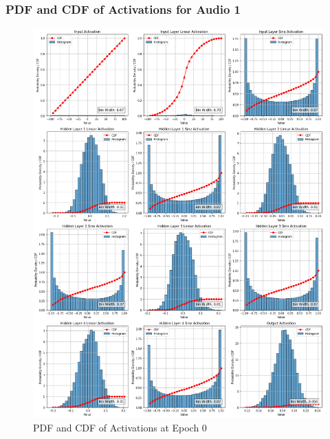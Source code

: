 \documentclass{ioereport}
\begin{document}
\subsubsection{PDF and CDF of Activations for Audio 1}

    \begin{figure}[H]
        \centering
        \includegraphics[width=\linewidth]{assets/audio histogram/epoch0activations.png}
        \caption{PDF and CDF of Activations at Epoch 0}
        \label{fig:audio-activation-0}
    \end{figure}
\end{document}
